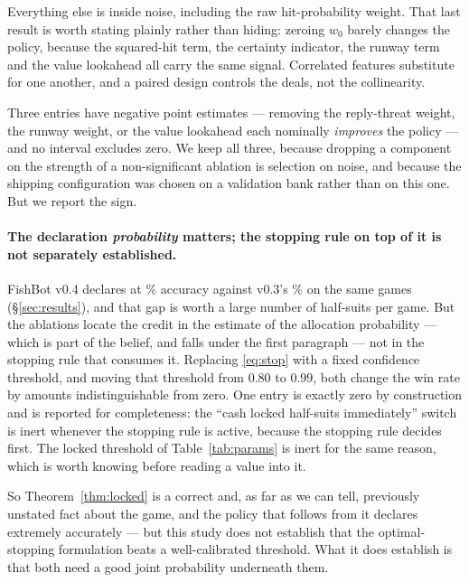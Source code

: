 Everything else is inside noise, including the raw hit-probability weight. That
last result is worth stating plainly rather than hiding: zeroing $w_0$ barely
changes the policy, because the squared-hit term, the certainty indicator, the
runway term and the value lookahead all carry the same signal. Correlated
features substitute for one another, and a paired design controls the deals, not
the collinearity.

Three entries have negative point estimates --- removing the reply-threat weight,
the runway weight, or the value lookahead each nominally \emph{improves} the
policy --- and no interval excludes zero. We keep all three, because dropping a
component on the strength of a non-significant ablation is selection on noise,
and because the shipping configuration was chosen on a validation bank rather
than on this one. But we report the sign.

\paragraph{The declaration \emph{probability} matters; the stopping rule on top
of it is not separately established.} FishBot v0.4 declares at
\numVsVthreeDeclAcc\% accuracy against v0.3's \numVthreeDeclObs\% on the same
games (\S\ref{sec:results}), and that gap is worth a large number of half-suits
per game. But the ablations locate the credit in the estimate of the allocation
probability --- which is part of the belief, and falls under the first paragraph
--- not in the stopping rule that consumes it. Replacing \eqref{eq:stop} with a
fixed confidence threshold, and moving that threshold from $0.80$ to $0.99$, both
change the win rate by amounts indistinguishable from zero. One entry is exactly
zero by construction and is reported for completeness: the ``cash locked
half-suits immediately'' switch is inert whenever the stopping rule is active,
because the stopping rule decides first. The locked threshold of
Table~\ref{tab:params} is inert for the same reason, which is worth knowing
before reading a value into it.

So Theorem~\ref{thm:locked} is a correct and, as far as we can tell, previously
unstated fact about the game, and the policy that follows from it declares
extremely accurately --- but this study does not establish that the
optimal-stopping formulation beats a well-calibrated threshold. What it does
establish is that both need a good joint probability underneath them.

